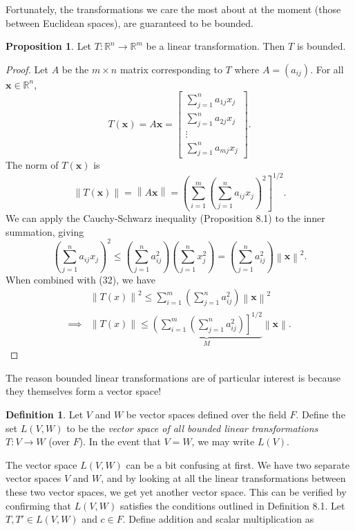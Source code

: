 \documentclass{article}
\newcommand{\R}{\mathbb{R}}
\newcommand{\x}{\mathbf{x}}
\newcommand{\norm}[1]{\left\lVert#1\right\rVert}
\theoremstyle{definition}
\newtheorem{proposition}{Proposition}[section]
\newtheorem{definition}{Definition}[section]
\begin{document}
	Fortunately, the transformations we care the most about at the moment (those between Euclidean spaces), are guaranteed to be bounded.
	\begin{proposition}
		Let $ T:\R^n\to\R^m $ be a linear transformation. Then $ T $ is bounded. 
	\end{proposition}
	\begin{proof}
		Let $ A $ be the $ m\times n $ matrix corresponding to $ T $ where $ A = (a_{ij}) $. For all $ \x\in \R^n $, $$ T(\x) = A\x = \begin{bmatrix}
			\sum_{j=1}^{n}a_{1j}x_j\\
			\sum_{j=1}^{n}a_{2j}x_j\\\vdots \\ 
			\sum_{j=1}^{n}a_{mj}x_j
		\end{bmatrix} .$$
		The norm of $ T(\x) $ is 
		\begin{equation}\label{key}
			\norm{T(\x)} = \norm{A\x} =\left( \sum_{i=1}^{m}\left(\sum_{j=1}^{n}a_{ij}x_j\right)^2\right]^{1/2} .
		\end{equation}
		We can apply the Cauchy-Schwarz inequality (Proposition 8.1) to the inner summation, giving 
		$$ \left(\sum_{j=1}^{n}a_{ij}x_j\right)^2 \le \left(\sum_{j=1}^{n}a_{ij}^2\right) \left(\sum_{j=1}^{n}x_j^2\right)= \left(\sum_{j=1}^{n}a_{ij}^2\right) \norm{\x}^2 .$$ When combined with (32), we have 
		\begin{align*}
			&\norm{T(x)} ^2\le  \sum_{i=1}^{m} \left(\sum_{j=1}^{n}a_{ij}^2\right)\norm{\x}^2\\
			\implies& \norm{T(x)} \le \underbrace{\left( \sum_{i=1}^{m} \left(\sum_{j=1}^{n}a_{ij}^2\right)\right]^{1/2}}_M\norm{\x} .
		\end{align*}
	\end{proof}
	The reason bounded linear transformations are of particular interest is because they themselves form a vector space!
	\begin{definition}\label{def}
		Let $ V $ and $ W $ be vector spaces defined over the field $ F $. Define the set $ L(V,W) $ to be the \textit{\color{red}vector space of all bounded linear transformations} $ T:V\to W $ (over $ F $). In the event that $ V =W $, we may write $ L(V) $. 
	\end{definition}
	The vector space $ L(V,W) $ can be a bit confusing at first. We have two separate vector spaces $ V $ and $ W $, and by looking at all the linear transformations between these two vector spaces, we get yet another vector space. This can be verified by confirming that $ L(V,W) $ satisfies the conditions outlined in Definition 8.1. Let $ T,T'\in L(V,W) $ and $ c\in F $. Define addition and scalar multiplication as 
\end{document}
